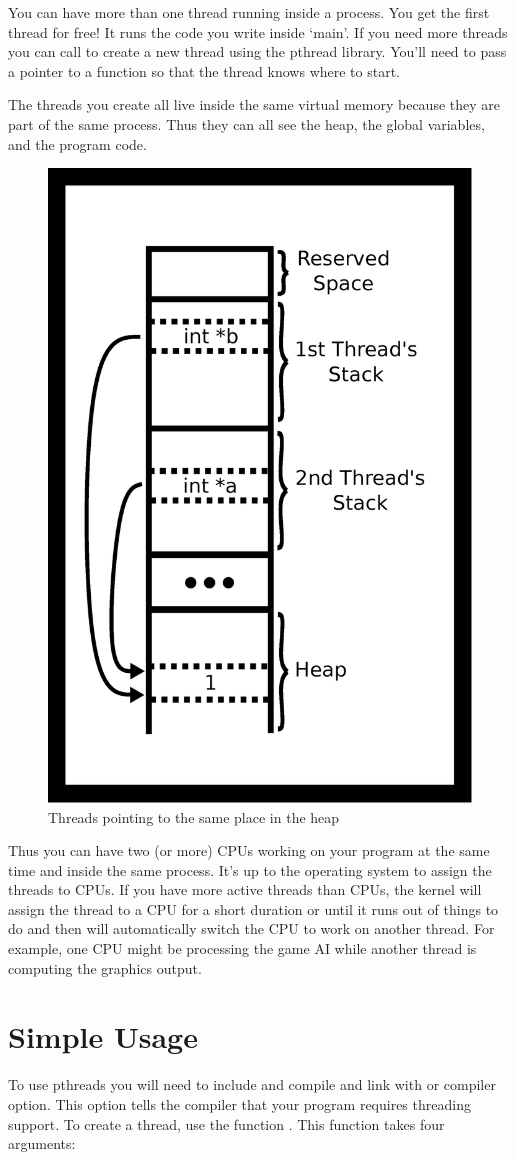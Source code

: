 You can have more than one thread running inside a process.
You get the first thread for free! It runs the code you write inside `main'.
If you need more threads you can call  to create a new thread using the pthread library. You'll need to pass a pointer to a function so that the thread knows where to start.

The threads you create all live inside the same virtual memory because they are part of the same process.
Thus they can all see the heap, the global variables, and the program code.

\begin{figure}[H]
\centering
\includegraphics[width=.5\textwidth]{threads/drawings/thread_stack_pointer.eps}
\caption{Threads pointing to the same place in the heap}
\end{figure}

Thus you can have two (or more) CPUs working on your program at the same time and inside the same process.
It's up to the operating system to assign the threads to CPUs.
If you have more active threads than CPUs, the kernel will assign the thread to a CPU for a short duration or until it runs out of things to do and then will automatically switch the CPU to work on another thread.
For example, one CPU might be processing the game AI while another thread is computing the graphics output.

\section{Simple Usage}

To use pthreads you will need to include  and compile and link with  or  compiler option.
This option tells the compiler that your program requires threading support.
To create a thread, use the function . This function takes four arguments:


